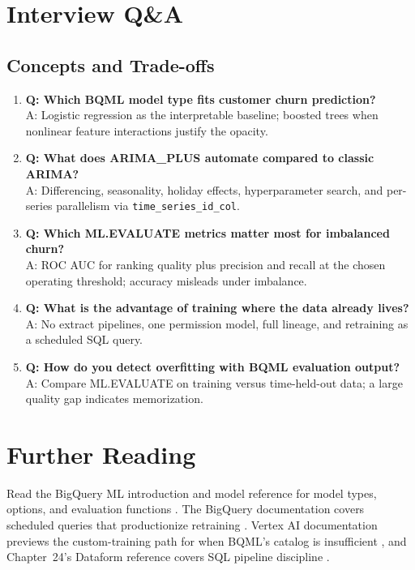 \section{Interview Q\&A}
\subsection{Concepts and Trade-offs}
\begin{enumerate}
    \item \textbf{Q: Which BQML model type fits customer churn prediction?}\\
    A: Logistic regression as the interpretable baseline; boosted trees when nonlinear feature interactions justify the opacity.

    \item \textbf{Q: What does ARIMA\_PLUS automate compared to classic ARIMA?}\\
    A: Differencing, seasonality, holiday effects, hyperparameter search, and per-series parallelism via \texttt{time\_series\_id\_col}.

    \item \textbf{Q: Which ML.EVALUATE metrics matter most for imbalanced churn?}\\
    A: ROC AUC for ranking quality plus precision and recall at the chosen operating threshold; accuracy misleads under imbalance.

    \item \textbf{Q: What is the advantage of training where the data already lives?}\\
    A: No extract pipelines, one permission model, full lineage, and retraining as a scheduled SQL query.

    \item \textbf{Q: How do you detect overfitting with BQML evaluation output?}\\
    A: Compare ML.EVALUATE on training versus time-held-out data; a large quality gap indicates memorization.
\end{enumerate}

\section{Further Reading}
Read the BigQuery ML introduction and model reference for model types, options, and evaluation functions \cite{googlecloudbqmldocs}. The BigQuery documentation covers scheduled queries that productionize retraining \cite{googlecloudbigquerydocs}. Vertex AI documentation previews the custom-training path for when BQML's catalog is insufficient \cite{googlecloudvertexaidocs}, and Chapter~24's Dataform reference covers SQL pipeline discipline \cite{googleclouddataformdocs}.

